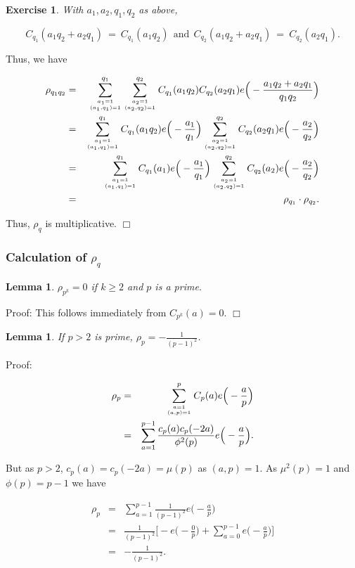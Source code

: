 \documentclass[12pt,letterpaper]{report}
\newcommand\be{\begin{equation}}
\newcommand\ee{\end{equation}}
\newcommand\bea{\begin{eqnarray}}
\newcommand\eea{\end{eqnarray}}
\newtheorem{lem}[thm]{Lemma}
\newtheorem{exe}[thm]{Exercise}
\begin{document}
\begin{exe} With $a_1, a_2, q_1, q_2$ as above,

\be C_{q_1}(a_1q_2+a_2q_1) \ = \ C_{q_1}(a_1q_2) \ \ \text{and} \
\ C_{q_2}(a_1q_2+a_2q_1) \ = \ C_{q_2}(a_2 q_1). \ee

\end{exe}

Thus, we have

\bea \rho_{q_1q_2} &=& \sum_{a_1 = 1 \atop (a_1,q_1) = 1}^{q_1}
\sum_{a_2 = 1 \atop (a_2,q_2) = 1}^{q_2} C_{q_1}(a_1q_2)
C_{q_2}(a_2 q_1) e\Big( -\frac{a_1q_2+a_2q_1}{q_1q_2} \Big)
\nonumber\\ &=& \sum_{a_1 = 1 \atop (a_1,q_1) = 1}^{q_1}
C_{q_1}(a_1q_2) e\Big( -\frac{a_1}{q_1} \Big) \sum_{a_2 = 1 \atop
(a_2,q_2) = 1}^{q_2} C_{q_2}(a_2q_1) e\Big( -\frac{a_2}{q_2} \Big)
\nonumber\\ &=& \sum_{a_1 = 1 \atop (a_1,q_1) = 1}^{q_1}
C_{q_1}(a_1) e\Big( -\frac{a_1}{q_1} \Big) \sum_{a_2 = 1 \atop
(a_2,q_2) = 1}^{q_2} C_{q_2}(a_2) e\Big( -\frac{a_2}{q_2} \Big)
\nonumber\\ &=& \rho_{q_1} \cdot \rho_{q_2}.  \eea

Thus, $\rho_q$ is multiplicative. $\Box$

\subsubsection{Calculation of $\rho_q$}

\begin{lem}\label{lemrhopk}
$\rho_{p^k} = 0$ if $k \ge 2$ and $p$ is a prime. \end{lem}

Proof: This follows immediately from $C_{p^k}(a) = 0$. $\Box$

\begin{lem}\label{lemrhop} If $p > 2$ is prime, $\rho_p = - \frac{1}{(p-1)^2}$.
\end{lem}

Proof:

\bea \rho_p &=& \sum_{a = 1\atop (a,p) = 1}^p C_p(a)
e\Big(-\frac{a}{p} \Big) \nonumber\\ &=& \sum_{a=1}^{p-1} \frac{
c_p(a) c_p(-2a)}{\phi^2(p)} e\Big(-\frac{a}{p} \Big). \eea

But as $p > 2$, $c_p(a) = c_p(-2a) = \mu(p)$ as $(a,p) = 1$. As
$\mu^2(p) = 1$ and $\phi(p) = p-1$ we have

\bea \rho_p &=& \sum_{a=1}^{p-1} \frac{1}{(p-1)^2}
e\Big(-\frac{a}{p} \Big) \nonumber\\ &=& \frac{1}{(p-1)^2} \Bigg[
- e\Big( -\frac{0}{p} \Big) + \sum_{a=0}^{p-1} e\Big( -
\frac{a}{p} \Big) \Bigg] \nonumber\\ &=& -\frac{1}{(p-1)^2}. \eea
\end{document}
